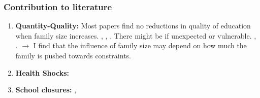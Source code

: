 \documentclass{beamer}
\begin{document}
\begin{frame}
    \label{frame:contribution}
    \hypersetup{citecolor=blue}
    \frametitle{Contribution to literature}
    \begin{enumerate}

    \item \textbf{Quantity-Quality:} Most papers find no reductions in quality of education when family size increases. {\footnotesize\cite{becker_child_1976}, \cite{black_more_2005}, \cite{caceres-delpiano_impacts_2006} \cite{conley_parental_2006}}. There might be if unexpected or vulnerable. {\footnotesize\cite{black_small_2010}, \cite{aslund_family_2010}.}
    $\rightarrow$ I find that the influence of family size may depend on how much the family is pushed towards constraints.

    \item \textbf{Health Shocks:} {\footnotesize\cite{adhvaryu_endowments_2016}}

    \item \textbf{School closures:} 
    {\footnotesize \cite{haelermans_inequality_2022}, \cite{jakubowski_global_2023}}
   
    
     

    \end{enumerate}
\end{frame}
\end{document}
